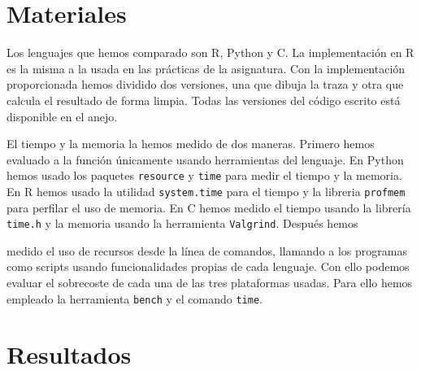 \documentclass{article}
\newcommand{\C}{C }
\newcommand{\R}{R }
\newcommand{\python}{Python }
\begin{document}
\section{Materiales}

Los lenguajes que hemos comparado son R, Python y C. La implementación
en \R es la misma a la usada en las prácticas de la asignatura. Con la
implementación proporcionada hemos dividido  dos  versiones,  una  que
dibuja la traza y otra que calcula el resultado de forma limpia. Todas
las  versiones	del  código  escrito  está  disponible	en  el	anejo.

El tiempo y la memoria la hemos medido de dos maneras. Primero hemos
evaluado a la función únicamente usando herramientas del lenguaje. En
\python hemos usado los paquetes
\lstinline[style=matlab-editor]{resource}\cite{resource_2020} y
\lstinline[style=matlab-editor]{time}\cite{time_2020} para medir el
tiempo y la memoria. En \R hemos usado la utilidad
\lstinline[style=matlab-editor]{system.time}\cite{system.time_documentation}
para el tiempo y la libreria
\lstinline[style=matlab-editor]{profmem}\cite{bengtsson} para perfilar
el uso de memoria. En \C{} hemos medido el tiempo usando la librería
\lstinline[style=matlab-editor]{time.h}\cite{timeh} y la memoria usando la
herramienta \lstinline[style=matlab-editor]{Valgrind}\cite{Valgrind10}. Después hemos

medido el uso de recursos desde la línea de comandos, llamando a los
programas como scripts usando funcionalidades propias de cada
lenguaje. Con ello podemos evaluar el sobrecoste de cada una de las
tres plataformas usadas. Para ello hemos empleado la herramienta
\lstinline[style=matlab-editor]{bench}\cite{GitHubGa29}
y el comando \lstinline[style=matlab-editor]{time}\cite{timeh}.

\section{Resultados}
\end{document}
